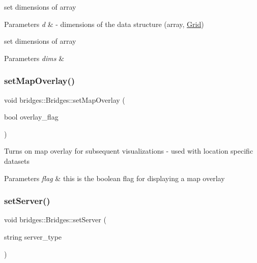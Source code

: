 set dimensions of array


\begin{DoxyParams}{Parameters}
{\em d} & -\/ dimensions of the data structure (array, \mbox{\hyperlink{classbridges_1_1_grid}{Grid}})\\
\hline
\end{DoxyParams}
set dimensions of array


\begin{DoxyParams}{Parameters}
{\em dims} & \\
\hline
\end{DoxyParams}
\mbox{\label{namespacebridges_1_1_bridges_a221442c674b625a403486076cf8a7c03}} 
\subsubsection{\texorpdfstring{set\+Map\+Overlay()}{setMapOverlay()}}
{\footnotesize\ttfamily void bridges\+::\+Bridges\+::set\+Map\+Overlay (\begin{DoxyParamCaption}\item[{bool}]{overlay\+\_\+flag }\end{DoxyParamCaption})}

Turns on map overlay for subsequent visualizations -\/ used with location specific datasets


\begin{DoxyParams}{Parameters}
{\em flag} & this is the boolean flag for displaying a map overlay \\
\hline
\end{DoxyParams}
\mbox{\label{namespacebridges_1_1_bridges_a569953bfdb1c2a29dbd0f7d6dee73606}} 
\subsubsection{\texorpdfstring{set\+Server()}{setServer()}}
{\footnotesize\ttfamily void bridges\+::\+Bridges\+::set\+Server (\begin{DoxyParamCaption}\item[{string}]{server\+\_\+type }\end{DoxyParamCaption})}


